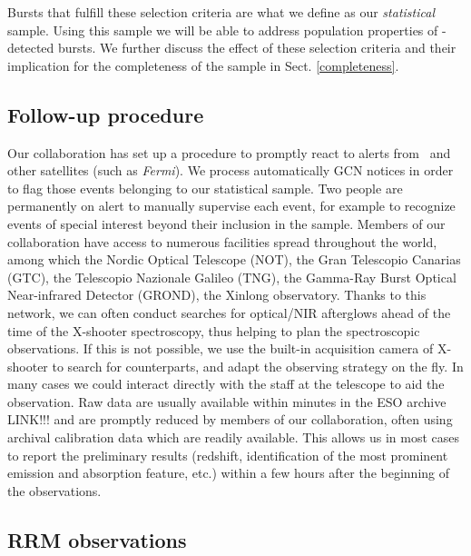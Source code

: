 \documentclass{aa}    %
\begin{document}
Bursts that fulfill these selection criteria are what we define as our
\textit{statistical} sample. Using this sample we will be able to address
population properties of \swift-detected bursts. We further discuss the effect
of these selection criteria and their implication for the completeness of the
sample in Sect. \ref{completeness}.

\subsection{Follow-up procedure}

Our collaboration has set up a procedure to promptly react to alerts from
\swift~and other satellites (such as \textit{Fermi}). We process automatically
GCN notices in order to flag those events belonging to our statistical sample.
Two people are permanently on alert to manually supervise each event, for
example to recognize events of special interest beyond their inclusion in the
sample. Members of our collaboration have access to numerous facilities spread
throughout the world, among which the Nordic Optical Telescope (NOT), the Gran
Telescopio Canarias (GTC), the Telescopio Nazionale Galileo (TNG), the Gamma-Ray
Burst Optical Near-infrared Detector (GROND), the Xinlong observatory. Thanks to
this network, we can often conduct searches for optical/NIR afterglows ahead of
the time of the X-shooter spectroscopy, thus helping to plan the spectroscopic
observations. If this is not possible, we use the built-in acquisition camera of
X-shooter to search for counterparts, and adapt the observing strategy on the
fly. In many cases we could interact directly with the staff at the telescope to
aid the observation. Raw data are usually available within minutes in the ESO
archive LINK!!! and are promptly reduced by members of our collaboration, often
using archival calibration data which are readily available. This allows us in
most cases to report the preliminary results (redshift, identification of the
most prominent emission and absorption feature, etc.) within a few hours after
the beginning of the observations.


\subsection{RRM observations} \label{RRM}
\end{document}
